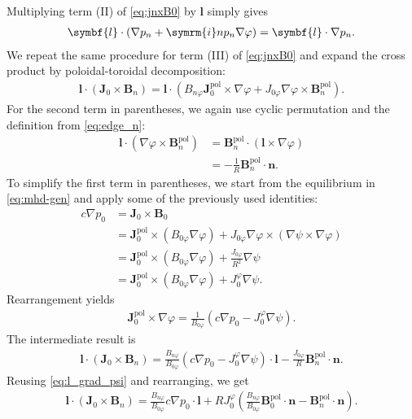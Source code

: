 \documentclass[a4paper, twoside, 10pt, english]{article}
\numberwithin{equation}{section}
\let\temp\varrho
\let\varrho\rho
\let\rho\temp
\let\temp\vartheta
\let\vartheta\theta
\let\theta\temp
\let\temp\varphi
\let\varphi\phi
\let\phi\temp
\let\vec\symbf
\newcommand*\grad{\ensuremath{\nabla}}
\newcommand*\im{\ensuremath{\symrm{i}}}  %
\newcommand*\pol{\ensuremath{\textrm{pol}}}  %
\begin{document}
Multiplying term (II) of \cref{eq:jnxB0} by $\vec{l}$ simply gives
\begin{gather}
  \vec{l} \cdot (\grad p_{n} + \im n p_{n} \grad \phi) = \vec{l} \cdot \grad p_{n}. \label{eq:jnxB0_II}
\end{gather}
We repeat the same procedure for term (III) of \cref{eq:jnxB0} and expand the cross product by poloidal-toroidal decomposition:
\begin{gather}
  \vec{l} \cdot (\vec{J}_{0} \times \vec{B}_{n}) = \vec{l} \cdot (B_{n \phi} \vec{J}_{0}^{\pol} \times \grad \phi + J_{0 \phi} \grad \phi \times \vec{B}_{n}^{\pol}).
\end{gather}
For the second term in parentheses, we again use cyclic permutation and the definition from \cref{eq:edge_n}:
\begin{align}
  \vec{l} \cdot (\grad \phi \times \vec{B}_{n}^{\pol}) &= \vec{B}_{n}^{\pol} \cdot (\vec{l} \times \grad \phi) \nonumber \\
  &= -\frac{1}{R} \vec{B}_{n}^{\pol} \cdot \vec{n}.
\end{align}
To simplify the first term in parentheses, we start from the equilibrium in \cref{eq:mhd-gen} and apply some of the previously used identities:
\begin{align}
  c \grad p_{0} &= \vec{J}_{0} \times \vec{B}_{0} \nonumber \\
  &= \vec{J}_{0}^{\pol} \times (B_{0 \phi} \grad \phi) + J_{0 \phi} \grad \phi \times (\grad \psi \times \grad \phi) \nonumber \\
  &= \vec{J}_{0}^{\pol} \times (B_{0 \phi} \grad \phi) + \frac{J_{0 \phi}}{R^{2}} \grad \psi \nonumber \\
  &= \vec{J}_{0}^{\pol} \times (B_{0 \phi} \grad \phi) + J_{0}^{\phi} \grad \psi.
\end{align}
Rearrangement yields
\begin{gather}
  \vec{J}_{0}^{\pol} \times \grad \phi = \frac{1}{B_{0 \phi}} \left( c \grad p_{0} - J_{0}^{\phi} \grad \psi \right).
\end{gather}
The intermediate result is
\begin{gather}
  \vec{l} \cdot (\vec{J}_{0} \times \vec{B}_{n}) = \frac{B_{n \phi}}{B_{0 \phi}} \left ( c \grad p_{0} - J_{0}^{\phi} \grad \psi \right ) \cdot \vec{l} - \frac{J_{0 \phi}}{R} \vec{B}_{n}^{\pol} \cdot \vec{n}.
\end{gather}
Reusing \cref{eq:l_grad_psi} and rearranging, we get
\begin{gather}
  \vec{l} \cdot (\vec{J}_{0} \times \vec{B}_{n}) = \frac{B_{n \phi}}{B_{0 \phi}} c \grad p_{0} \cdot \vec{l} + R J_{0}^{\phi} \left ( \frac{B_{n \phi}}{B_{0 \phi}} \vec{B}_{0}^{\pol} \cdot \vec{n} - \vec{B}_{n}^{\pol} \cdot \vec{n} \right ). \label{eq:jnxB0_III}
\end{gather}
\end{document}
